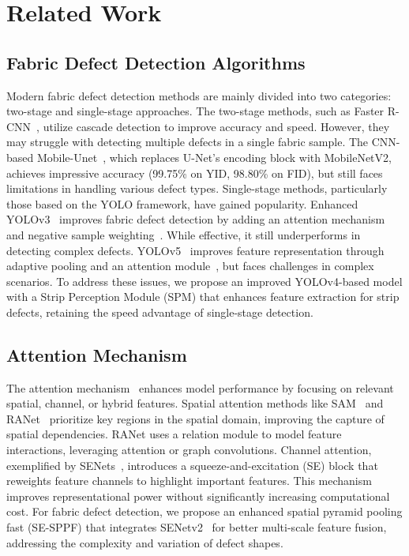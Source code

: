 \section{Related Work}
\label{sec:rw}

\subsection{Fabric Defect Detection Algorithms}
Modern fabric defect detection methods are mainly divided into two categories: two-stage and single-stage approaches. The two-stage methods, such as Faster R-CNN~\cite{ren_2017_faster}, utilize cascade detection to improve accuracy and speed. However, they may struggle with detecting multiple defects in a single fabric sample. The CNN-based Mobile-Unet~\cite{jing_2020_mobileunet}, which replaces U-Net’s encoding block with MobileNetV2, achieves impressive accuracy (99.75\% on YID, 98.80\% on FID), but still faces limitations in handling various defect types.
Single-stage methods, particularly those based on the YOLO framework, have gained popularity. Enhanced YOLOv3~\cite{redmon_2018_yolov3} improves fabric defect detection by adding an attention mechanism and negative sample weighting~\cite{jing_2020_fabric}. While effective, it still underperforms in detecting complex defects. YOLOv5~\cite{jocher_2020_ultralyticsyolov5} improves feature representation through adaptive pooling and an attention module~\cite{liu_2023_an}, but faces challenges in complex scenarios. To address these issues, we propose an improved YOLOv4-based model with a Strip Perception Module (SPM) that enhances feature extraction for strip defects, retaining the speed advantage of single-stage detection.

\subsection{Attention Mechanism}
The attention mechanism~\cite{shen2023pbsl,shen2023triplet} enhances model performance by focusing on relevant spatial, channel, or hybrid features. Spatial attention methods like SAM~\cite{zhu_2019_an} and RANet~\cite{shao_2023_ranet} prioritize key regions in the spatial domain, improving the capture of spatial dependencies. RANet uses a relation module to model feature interactions, leveraging attention or graph convolutions.
Channel attention, exemplified by SENets~\cite{hu_2018_squeezeandexcitation}, introduces a squeeze-and-excitation (SE) block that reweights feature channels to highlight important features. This mechanism improves representational power without significantly increasing computational cost. For fabric defect detection, we propose an enhanced spatial pyramid pooling fast (SE-SPPF) that integrates SENetv2~\cite{narayanan_2023_senetv2} for better multi-scale feature fusion, addressing the complexity and variation of defect shapes.

